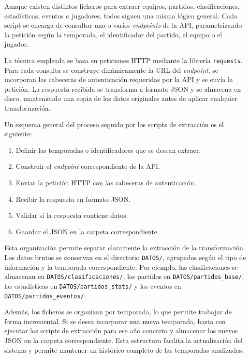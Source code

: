 Aunque existen distintos ficheros para extraer equipos, partidos, clasificaciones, estad\'isticas, eventos o jugadores, todos siguen una misma l\'ogica general. Cada script se encarga de consultar uno o varios \textit{endpoints} de la API, parametrizando la petici\'on seg\'un la temporada, el identificador del partido, el equipo o el jugador.

La t\'ecnica empleada se basa en peticiones HTTP mediante la librer\'ia \texttt{requests}. Para cada consulta se construye din\'amicamente la URL del \textit{endpoint}, se incorporan las cabeceras de autenticaci\'on requeridas por la API y se env\'ia la petici\'on. La respuesta recibida se transforma a formato JSON y se almacena en disco, manteniendo una copia de los datos originales antes de aplicar cualquier transformaci\'on.

Un esquema general del proceso seguido por los scripts de extracci\'on es el siguiente:

\begin{enumerate}
    \item Definir las temporadas o identificadores que se desean extraer.
    \item Construir el \textit{endpoint} correspondiente de la API.
    \item Enviar la petici\'on HTTP con las cabeceras de autenticaci\'on.
    \item Recibir la respuesta en formato JSON.
    \item Validar si la respuesta contiene datos.
    \item Guardar el JSON en la carpeta correspondiente.
\end{enumerate}

Esta organizaci\'on permite separar claramente la extracci\'on de la transformaci\'on. Los datos brutos se conservan en el directorio \texttt{DATOS/}, agrupados seg\'un el tipo de informaci\'on y la temporada correspondiente. Por ejemplo, las clasificaciones se almacenan en \texttt{DATOS/clasificaciones/}, los partidos en \texttt{DATOS/partidos\_base/}, las estad\'isticas en \texttt{DATOS/partidos\_stats/} y los eventos en \texttt{DATOS/partidos\_eventos/}.

Adem\'as, los ficheros se organizan por temporada, lo que permite trabajar de forma incremental. Si se desea incorporar una nueva temporada, basta con ejecutar los scripts de extracci\'on para ese a\~no concreto y almacenar los nuevos JSON en la carpeta correspondiente. Esta estructura facilita la actualizaci\'on del sistema y permite mantener un hist\'orico completo de las temporadas analizadas.

